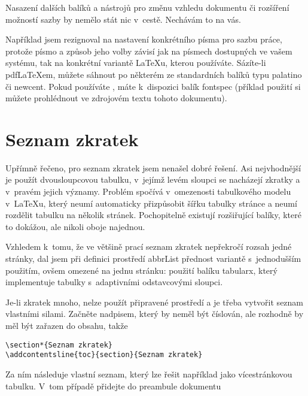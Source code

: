 \documentclass[FM,DP]{tulthesis}
\newcommand{\argument}[1]{{\ttfamily\color{\tulcolor}#1}}
\newenvironment{myquote}{\begin{list}{}{\setlength\leftmargin\parindent}\item[]}{\end{list}}
\newenvironment{listing}{\begin{myquote}\color{\tulcolor}}{\end{myquote}}
\begin{document}
Nasazení dalších balíků a nástrojů pro změnu vzhledu dokumentu či rozšíření
možností sazby by nemělo stát nic v~cestě. Nechávám to na vás.

Například jsem rezignoval na nastavení konkrétního písma pro sazbu práce,
protože písmo a způsob jeho volby závisí jak na písmech dostupných ve vašem
systému, tak na konkrétní variantě \LaTeX u, kterou používáte. Sázíte-li
pdf\-\LaTeX\-em, můžete sáhnout po některém ze standardních balíků typu
\argument{palatino} či \argument{newcent}. Pokud používáte \XeLaTeX, máte
k~dispozici balík \argument{fontspec} (příklad použití si můžete prohlédnout ve
zdrojovém textu tohoto dokumentu).


\section{Seznam zkratek}

Upřímně řečeno, pro seznam zkratek jsem nenašel dobré řešení. Asi nejvhodnější
je použít dvousloupcovou tabulku, v~jejímž levém sloupci se nacházejí zkratky a
v~pravém jejich významy. Problém spočívá v~omezenosti tabulkového modelu
v~\LaTeX u, který neumí automaticky přizpůsobit šířku tabulky stránce a neumí
rozdělit tabulku na několik stránek. Pochopitelně existují rozšiřující balíky,
které to dokážou, ale nikoli oboje najednou.

Vzhledem k~tomu, že ve většině prací seznam zkratek nepřekročí rozsah jedné
stránky, dal jsem při definici prostředí \argument{abbrList} přednost variantě
s~jednodušším použitím, ovšem omezené na jednu stránku: použití balíku
\argument{tabularx}, který implementuje tabulky s~adaptivními odstavcovými
sloupci.

Je-li zkratek mnoho, nelze použít připravené prostředí a je třeba vytvořit
seznam vlastními silami. Začněte nadpisem, který by neměl být číslován, ale
rozhodně by měl být zařazen do obsahu, takže

\begin{listing}
\begin{verbatim}
\section*{Seznam zkratek}
\addcontentsline{toc}{section}{Seznam zkratek}
\end{verbatim}
\end{listing}

Za ním následuje vlastní seznam, který lze řešit například jako vícestránkovou
tabulku. V~tom případě přidejte do preambule dokumentu
\end{document}
